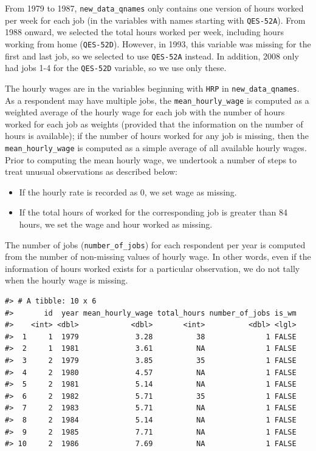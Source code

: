 \documentclass[12pt]{article}
\providecommand{\tightlist}{%
  \setlength{\itemsep}{0pt}\setlength{\parskip}{0pt}}
\begin{document}
From 1979 to 1987, \texttt{new\_data\_qnames} only contains one version of hours worked per week for each job (in the variables with names starting with \texttt{QES-52A}). From 1988 onward, we selected the total hours worked per week, including hours working from home (\texttt{QES-52D}). However, in 1993, this variable was missing for the first and last job, so we selected to use \texttt{QES-52A} instead. In addition, 2008 only had jobs 1-4 for the \texttt{QES-52D} variable, so we use only these.

The hourly wages are in the variables beginning with \texttt{HRP} in \texttt{new\_data\_qnames}. As a respondent may have multiple jobs, the \texttt{mean\_hourly\_wage} is computed as a weighted average of the hourly wage for each job with the number of hours worked for each job as weights (provided that the information on the number of hours is available); if the number of hours worked for any job is missing, then the \texttt{mean\_hourly\_wage} is computed as a simple average of all available hourly wages. Prior to computing the mean hourly wage, we undertook a number of steps to treat unusual observations as described below:

\begin{itemize}
\tightlist
\item
  If the hourly rate is recorded as 0, we set wage as missing.
\item
  If the total hours of worked for the corresponding job is greater than 84 hours, we set the wage and hour worked as missing.
\end{itemize}

The number of jobs (\texttt{number\_of\_jobs}) for each respondent per year is computed from the number of non-missing values of hourly wage. In other words, even if the information of hours worked exists for a particular observation, we do not tally when the hourly wage is missing.

\begin{verbatim}
#> # A tibble: 10 x 6
#>       id  year mean_hourly_wage total_hours number_of_jobs is_wm
#>    <int> <dbl>            <dbl>       <int>          <dbl> <lgl>
#>  1     1  1979             3.28          38              1 FALSE
#>  2     1  1981             3.61          NA              1 FALSE
#>  3     2  1979             3.85          35              1 FALSE
#>  4     2  1980             4.57          NA              1 FALSE
#>  5     2  1981             5.14          NA              1 FALSE
#>  6     2  1982             5.71          35              1 FALSE
#>  7     2  1983             5.71          NA              1 FALSE
#>  8     2  1984             5.14          NA              1 FALSE
#>  9     2  1985             7.71          NA              1 FALSE
#> 10     2  1986             7.69          NA              1 FALSE
\end{verbatim}
\end{document}
